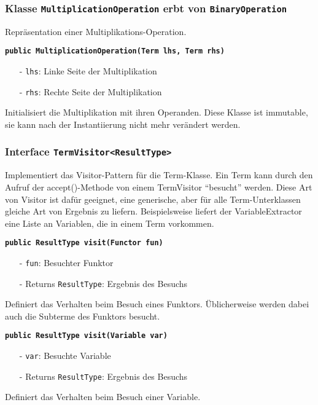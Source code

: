 \documentclass[parskip=full,11pt,twoside]{scrartcl}
\begin{document}
\subsubsection{Klasse \texttt{MultiplicationOperation} erbt von \texttt{BinaryOperation}}
Repräsentation einer Multiplikations-Operation.

\textbf{\texttt{public MultiplicationOperation(Term lhs, Term rhs)}}
\begin{itemize}[noitemsep]
	\item[-] \texttt{lhs}: Linke Seite der Multiplikation
	\item[-] \texttt{rhs}: Rechte Seite der Multiplikation
\end{itemize}
Initialisiert die Multiplikation mit ihren Operanden. Diese Klasse ist immutable, sie kann nach der Instantiierung nicht mehr verändert werden.
\subsubsection{Interface \texttt{TermVisitor<ResultType>}}
Implementiert das Visitor-Pattern für die Term-Klasse. Ein Term kann durch den Aufruf der accept()-Methode von einem TermVisitor \enquote{besucht} werden. Diese Art von Visitor ist dafür geeignet, eine generische, aber für alle Term-Unterklassen gleiche Art von Ergebnis zu liefern. Beispielsweise liefert der VariableExtractor eine Liste an Variablen, die in einem Term vorkommen.

\textbf{\texttt{public ResultType visit(Functor fun)}}
\begin{itemize}[noitemsep]
	\item[-] \texttt{fun}: Besuchter Funktor
	\item[-] Returns \texttt{ResultType}: Ergebnis des Besuchs
\end{itemize}
Definiert das Verhalten beim Besuch eines Funktors. Üblicherweise werden dabei auch die Subterme des Funktors besucht.

\textbf{\texttt{public ResultType visit(Variable var)}}
\begin{itemize}[noitemsep]
	\item[-] \texttt{var}: Besuchte Variable
	\item[-] Returns \texttt{ResultType}: Ergebnis des Besuchs
\end{itemize}
Definiert das Verhalten beim Besuch einer Variable.
\end{document}

